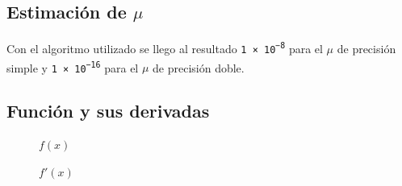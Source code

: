 \documentclass[11pt,a4paper]{article}
\begin{document}
\subsection{Estimación de \( \mu \) }

Con el algoritmo utilizado se llego al resultado \texttt{\num{1e-8}} para el \(\mu\) de precisión simple y \texttt{\num{1e-16}} para el \(\mu\) de precisión doble.

\subsection{Función y sus derivadas}

\begin{figure}[H]
	\caption{\(f(x)\)}
	\label{fig:funcion}
\end{figure}

\begin{figure}[H]
	\caption{\(f'(x)\)}
	\label{fig:funcionderivada}
\end{figure}
\end{document}
